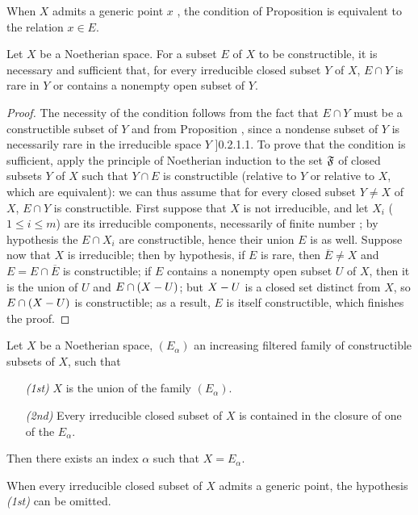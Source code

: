When $X$ admits a generic point $x$ , the condition of Proposition  is equivalent to the relation $x\in E$.

\begin{prop}[9.2.3]
\label{0.9.2.3}
Let $X$ be a Noetherian space.
For a subset $E$ of $X$ to be constructible, it is necessary and sufficient that, for every irreducible closed subset $Y$ of $X$, $E\cap Y$ is rare in $Y$ or contains a nonempty open subset of $Y$.
\end{prop}

\begin{proof}
\label{proof-0.9.2.3}
The necessity of the condition follows from the fact that $E\cap Y$ must be a constructible subset of $Y$ and from Proposition , since a nondense subset of $Y$ is necessarily rare in the irreducible space $Y$ \sref[0]]{0.2.1.1}.
To prove that the condition is sufficient, apply the principle of Noetherian induction  to the set $\mathfrak{F}$ of closed subsets $Y$ of $X$ such that $Y\cap E$ is constructible (relative to $Y$ or relative to $X$, which are equivalent): we can thus assume that for every closed subset $Y\neq X$ of $X$, $E\cap Y$ is constructible.
First suppose that $X$ is not irreducible, and let $X_i$ ($1\leqslant i\leqslant m$) are its irreducible components, necessarily of finite number ; by hypothesis the $E\cap X_i$ are constructible, hence their union $E$ is as well.
Suppose now that $X$ is irreducible; then by hypothesis, if $E$ is rare, then $\overline{E}\neq X$ and $E=E\cap\overline{E}$ is constructible; if $E$ contains a nonempty open subset $U$ of $X$, then it is the union of $U$ and $E\cap(X- U)$; but $X- U$ is a closed set distinct from $X$, so $E\cap(X- U)$ is constructible; as a result, $E$ is itself constructible, which finishes the proof.
\end{proof}

\begin{cor}[9.2.4]
\label{0.9.2.4}
Let $X$ be a Noetherian space, $(E_\alpha)$ an increasing filtered family of constructible subsets of $X$, such that
\begin{enumerate}
  \item[\emph{(1st)}] $X$ is the union of the family $(E_\alpha)$.
  \item[\emph{(2nd)}] Every irreducible closed subset of $X$ is contained in the closure of one of the $E_\alpha$.
\end{enumerate}

Then there exists an index $\alpha$ such that $X=E_\alpha$.

When every irreducible closed subset of $X$ admits a generic point, the hypothesis \emph{(1st)} can be omitted.
\end{cor}

